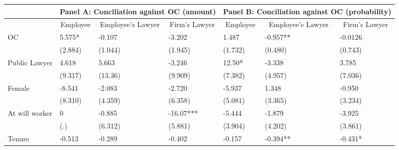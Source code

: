 \begin{tabular}{rrrrrrr}
\toprule
      & \multicolumn{3}{c}{Panel A: Conciliation against OC (amount)} & \multicolumn{3}{c}{Panel B: Conciliation against OC (probability)} \\
\midrule
      & \multicolumn{1}{c}{Employee} & \multicolumn{1}{c}{Employee's Lawyer} & \multicolumn{1}{c}{Firm's Lawyer} & \multicolumn{1}{c}{Employee} & \multicolumn{1}{c}{Employee's Lawyer} & \multicolumn{1}{c}{Firm's Lawyer} \\
\multicolumn{1}{l}{OC} & \multicolumn{1}{l}{5.575*} & \multicolumn{1}{l}{-0.107} & \multicolumn{1}{l}{-3.202} & \multicolumn{1}{l}{1.487} & \multicolumn{1}{l}{-0.957**} & \multicolumn{1}{l}{-0.0126} \\
\multicolumn{1}{l}{} & \multicolumn{1}{l}{(2.884)} & \multicolumn{1}{l}{(1.044)} & \multicolumn{1}{l}{(1.945)} & \multicolumn{1}{l}{(1.732)} & \multicolumn{1}{l}{(0.480)} & \multicolumn{1}{l}{(0.743)} \\
\multicolumn{1}{l}{Public Lawyer} & \multicolumn{1}{l}{4.618} & \multicolumn{1}{l}{5.663} & \multicolumn{1}{l}{-3.246} & \multicolumn{1}{l}{12.50*} & \multicolumn{1}{l}{-3.338} & \multicolumn{1}{l}{3.785} \\
\multicolumn{1}{l}{} & \multicolumn{1}{l}{(9.317)} & \multicolumn{1}{l}{(13.36)} & \multicolumn{1}{l}{(9.909)} & \multicolumn{1}{l}{(7.382)} & \multicolumn{1}{l}{(4.957)} & \multicolumn{1}{l}{(7.036)} \\
\multicolumn{1}{l}{Female} & \multicolumn{1}{l}{-8.541} & \multicolumn{1}{l}{-2.083} & \multicolumn{1}{l}{-2.720} & \multicolumn{1}{l}{-5.937} & \multicolumn{1}{l}{1.348} & \multicolumn{1}{l}{-0.950} \\
\multicolumn{1}{l}{} & \multicolumn{1}{l}{(8.310)} & \multicolumn{1}{l}{(4.359)} & \multicolumn{1}{l}{(6.358)} & \multicolumn{1}{l}{(5.081)} & \multicolumn{1}{l}{(3.365)} & \multicolumn{1}{l}{(3.234)} \\
\multicolumn{1}{l}{At will worker} & \multicolumn{1}{l}{0} & \multicolumn{1}{l}{-0.885} & \multicolumn{1}{l}{-16.07***} & \multicolumn{1}{l}{-5.444} & \multicolumn{1}{l}{-1.879} & \multicolumn{1}{l}{-3.925} \\
\multicolumn{1}{l}{} & \multicolumn{1}{l}{(.)} & \multicolumn{1}{l}{(6.312)} & \multicolumn{1}{l}{(5.881)} & \multicolumn{1}{l}{(3.904)} & \multicolumn{1}{l}{(4.202)} & \multicolumn{1}{l}{(3.861)} \\
\multicolumn{1}{l}{Tenure} & \multicolumn{1}{l}{-0.513} & \multicolumn{1}{l}{-0.289} & \multicolumn{1}{l}{-0.402} & \multicolumn{1}{l}{-0.157} & \multicolumn{1}{l}{-0.394**} & \multicolumn{1}{l}{-0.431*} \\

\end{tabular}
